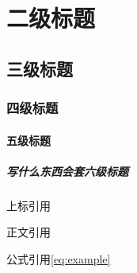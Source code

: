 
\section{二级标题}

\subsection{三级标题}

\subsubsection{四级标题}

\paragraph{五级标题}

\subparagraph{写什么东西会套六级标题}

上标引用\cite{张军2022基于数据驱动的微电网双层鲁棒优化调度}

正文引用\parencite{张军2022基于数据驱动的微电网双层鲁棒优化调度}

公式引用\eqref{eq:example}


